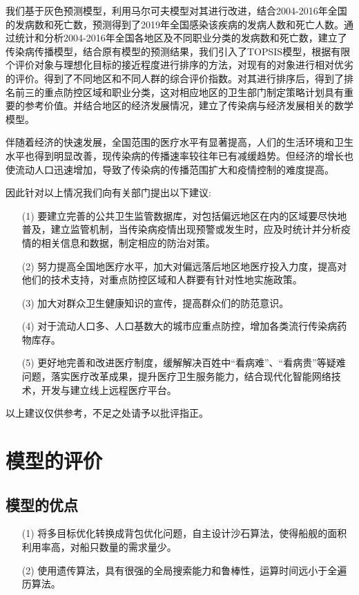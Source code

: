 \documentclass{whutmod}
\begin{document}
    我们基于灰色预测模型，利用马尔可夫模型对其进行改进，结合2004-2016年全国的发病数和死亡数，预测得到了2019年全国感染该疾病的发病人数和死亡人数。通过统计和分析2004-2016年全国各地区及不同职业分类的发病数和死亡数，建立了传染病传播模型，结合原有模型的预测结果，我们引入了TOPSIS模型，根据有限个评价对象与理想化目标的接近程度进行排序的方法，对现有的对象进行相对优劣的评价。得到了不同地区和不同人群的综合评价指数。对其进行排序后，得到了排名前三的重点防控区域和职业分类，这对相应地区的卫生部门制定策略计划具有重要的参考价值。并结合地区的经济发展情况，建立了传染病与经济发展相关的数学模型。
    
    伴随着经济的快速发展，全国范围的医疗水平有显著提高，人们的生活环境和卫生水平也得到明显改善，现传染病的传播速率较往年已有减缓趋势。但经济的增长也使流动人口迅速增加，导致了传染病的传播范围扩大和疫情控制的难度提高。 
    
    因此针对以上情况我们向有关部门提出以下建议:
    \begin{itemize}                                             
    	\item [(1)] 要建立完善的公共卫生监管数据库，对包括偏远地区在内的区域要尽快地普及，建立监管机制，当传染病疫情出现预警或发生时，应及时统计并分析疫情的相关信息和数据，制定相应的防治对策。
    	\item[(2)]努力提高全国地医疗水平，加大对偏远落后地区地医疗投入力度，提高对他们的技术支持，对重点防控区域和人群要有针对性地实施政策。
    	\item [(3)]加大对群众卫生健康知识的宣传，提高群众们的防范意识。
    	\item [(4)]对于流动人口多、人口基数大的城市应重点防控，增加各类流行传染病药物库存。
    	\item [(5)]更好地完善和改进医疗制度，缓解解决百姓中“看病难”、“看病贵”等疑难问题，落实医疗改革成果，提升医疗卫生服务能力，结合现代化智能网络技术，开发与建立线上远程医疗平台。	
    \end{itemize}
	以上建议仅供参考，不足之处请予以批评指正。


	\section{模型的评价}
	
	\subsection{模型的优点}
		\begin{itemize}                                             

		\item [(1)] 将多目标优化转换成背包优化问题，自主设计沙石算法，使得船舰的面积利用率高，对船只数量的需求量少。
		\item [(2)] 使用遗传算法，具有很强的全局搜索能力和鲁棒性，运算时间远小于全遍历算法。
	\end{itemize}
\end{document}
